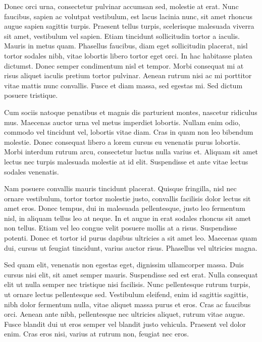 \documentclass[a4paper]{article}
\begin{document}
Donec orci urna, consectetur pulvinar accumsan sed, molestie at erat. Nunc faucibus, sapien ac volutpat vestibulum, est lacus lacinia nunc, sit amet rhoncus augue sapien sagittis turpis. Praesent tellus turpis, scelerisque malesuada viverra sit amet, vestibulum vel sapien. Etiam tincidunt sollicitudin tortor a iaculis. Mauris in metus quam. Phasellus faucibus, diam eget sollicitudin placerat, nisl tortor sodales nibh, vitae lobortis libero tortor eget orci. In hac habitasse platea dictumst. Donec semper condimentum nisl et tempor. Morbi consequat mi at risus aliquet iaculis pretium tortor pulvinar. Aenean rutrum nisi ac mi porttitor vitae mattis nunc convallis. Fusce et diam massa, sed egestas mi. Sed dictum posuere tristique.

Cum sociis natoque penatibus et magnis dis parturient montes, nascetur ridiculus mus. Maecenas auctor urna vel metus imperdiet lobortis. Nullam enim odio, commodo vel tincidunt vel, lobortis vitae diam. Cras in quam non leo bibendum molestie. Donec consequat libero a lorem cursus eu venenatis purus lobortis. Morbi interdum rutrum arcu, consectetur luctus nulla varius et. Aliquam sit amet lectus nec turpis malesuada molestie at id elit. Suspendisse et ante vitae lectus sodales venenatis.

Nam posuere convallis mauris tincidunt placerat. Quisque fringilla, nisl nec ornare vestibulum, tortor tortor molestie justo, convallis facilisis dolor lectus sit amet eros. Donec tempus, dui in malesuada pellentesque, justo leo fermentum nisl, in aliquam tellus leo at neque. In et augue in erat sodales rhoncus sit amet non tellus. Etiam vel leo congue velit posuere mollis at a risus. Suspendisse potenti. Donec et tortor id purus dapibus ultricies a sit amet leo. Maecenas quam dui, cursus ut feugiat tincidunt, varius auctor risus. Phasellus vel ultricies magna.

Sed quam elit, venenatis non egestas eget, dignissim ullamcorper massa. Duis cursus nisi elit, sit amet semper mauris. Suspendisse sed est erat. Nulla consequat elit ut nulla semper nec tristique nisi facilisis. Nunc pellentesque rutrum turpis, ut ornare lectus pellentesque sed. Vestibulum eleifend, enim id sagittis sagittis, nibh dolor fermentum nulla, vitae aliquet massa purus et eros. Cras ac faucibus orci. Aenean ante nibh, pellentesque nec ultricies aliquet, rutrum vitae augue. Fusce blandit dui ut eros semper vel blandit justo vehicula. Praesent vel dolor enim. Cras eros nisi, varius at rutrum non, feugiat nec eros.
\end{document}

